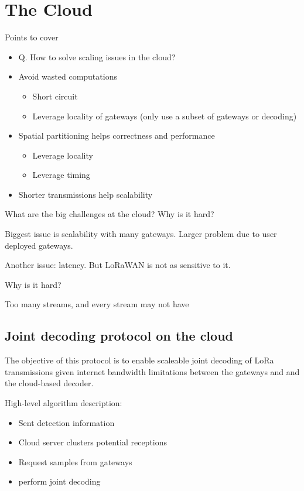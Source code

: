 \section{The Cloud}
\label{sec:cloud}

{\color{blue}
Points to cover
\begin{itemize} 
    \item Q. How to solve scaling issues in the cloud?
    \item Avoid wasted computations
        \begin{itemize}
            \item Short circuit
            \item Leverage locality of gateways (only use a subset of gateways  or decoding)
        \end{itemize}
    \item Spatial partitioning helps correctness and performance
        \begin{itemize}
            \item Leverage locality
            \item Leverage timing
        \end{itemize}
    \item Shorter transmissions help scalability
\end{itemize}
}

What are the big challenges at the cloud? Why is it hard?

Biggest issue is scalability with many gateways. Larger problem due to user deployed gateways.

Another issue: latency. But LoRaWAN is not as sensitive to it.

Why is it hard?

Too many streams, and every stream may not have 

\subsection{Joint decoding protocol on the cloud}
\label{sec:joint-decoding-cloud}


The objective of this protocol is to enable scaleable joint decoding of LoRa
transmissions given internet bandwidth limitations between the gateways and
and the cloud-based decoder.

{\color{blue} High-level algorithm description:
\begin{itemize}
    \item Sent detection information
    \item Cloud server clusters potential receptions
    \item Request samples from gateways
    \item perform joint decoding
\end{itemize}
}
